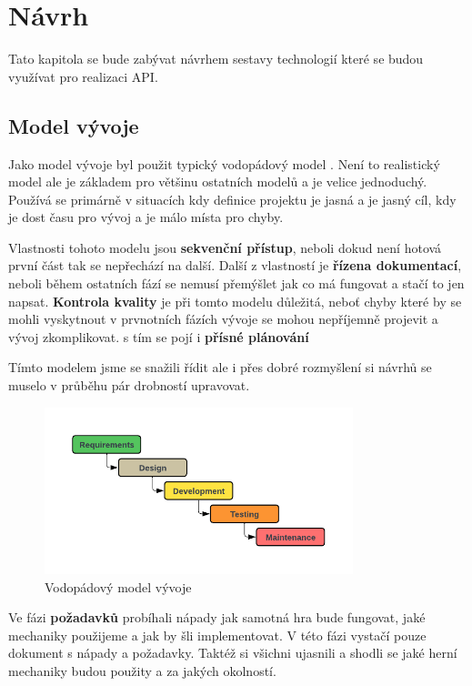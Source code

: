 \chapter{Návrh}\label{chap:design}
Tato kapitola se bude zabývat návrhem sestavy technologií které se budou využívat pro realizaci API.

\section{Model vývoje}\label{sec:development_model}
Jako model vývoje byl použit typický vodopádový model . Není to realistický model ale je základem pro většinu ostatních modelů a je velice jednoduchý. Používá se primárně v situacích kdy definice projektu je jasná a je jasný cíl, kdy je dost času pro vývoj a je málo místa pro chyby.

Vlastnosti tohoto modelu jsou \textbf{sekvenční přístup}, neboli dokud není hotová první část tak se nepřechází na další. Další z vlastností je \textbf{řízena dokumentací}, neboli během ostatních fází se nemusí přemýšlet jak co má fungovat a stačí to jen napsat. \textbf{Kontrola kvality} je při tomto modelu důležitá, neboť chyby které by se mohli vyskytnout v prvnotních fázích vývoje se mohou nepříjemně projevit a vývoj zkomplikovat. s tím se pojí i \textbf{přísné plánování}

Tímto modelem jsme se snažili řídit ale i přes dobré rozmyšlení si návrhů se muselo v průběhu pár drobností upravovat. 

\begin{figure}[!ht]
    \centering
    \includegraphics[width=0.8\textwidth]{figures/impl/API Implementation - waterfall model.pdf}
    \caption{Vodopádový model vývoje}\label{fig:waterfall}
\end{figure}

Ve fázi \textbf{požadavků} probíhali nápady jak samotná hra bude fungovat, jaké mechaniky použijeme a jak by šli implementovat. V této fázi vystačí pouze dokument s nápady a požadavky. Taktéž si všichni ujasnili a shodli se jaké herní mechaniky budou použity a za jakých okolností. 


